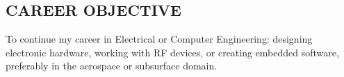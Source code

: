 \documentclass[line,mmmargin]{res}
\begin{document}
\address{51 Irene St.}
\address{Chicopee MA 01013}
 
\begin{resume}
 \setlength\multicolsep{0pt}

\section{CAREER OBJECTIVE}   
	To continue my career in Electrical or Computer Engineering: 
	designing electronic hardware, working with RF devices, or creating 
	embedded software, preferably in the aerospace or subsurface domain.
 

\end{resume}
\end{document}
